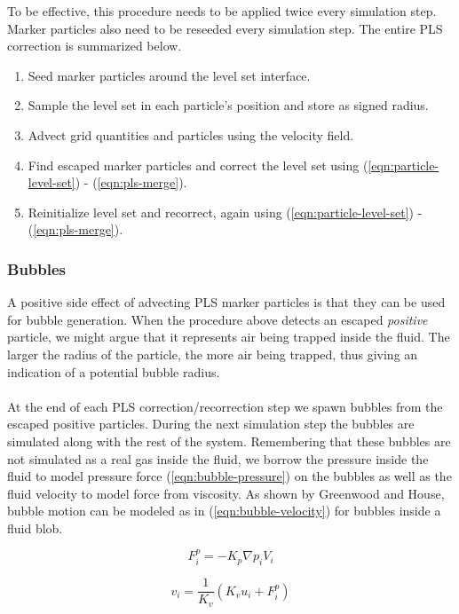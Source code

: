\documentclass[twocolumn]{article}
\begin{document}
To be effective, this procedure needs to be applied twice every simulation step. Marker particles also need to be reseeded every simulation step. The entire PLS correction is summarized below.

\begin{enumerate}
  \item Seed marker particles around the level set interface.
    \item Sample the level set in each particle's position and store as signed radius.
    \item Advect grid quantities and particles using the velocity field.
    \item Find escaped marker particles and correct the level set using (\ref{eqn:particle-level-set}) - (\ref{eqn:pls-merge}).
    \item Reinitialize level set and recorrect, again using (\ref{eqn:particle-level-set}) - (\ref{eqn:pls-merge}).
\end{enumerate}

\subsubsection{Bubbles}
A positive side effect of advecting PLS marker particles is that they can be used for bubble generation. When the procedure above detects an escaped \emph{positive} particle, we might argue that it represents air being trapped inside the fluid. The larger the radius of the particle, the more air being trapped, thus giving an indication of a potential bubble radius.
\\\\
At the end of each PLS correction/recorrection step we spawn bubbles from the escaped positive particles. During the next simulation step the bubbles are simulated along with the rest of the system. Remembering that these bubbles are not simulated as a real gas inside the fluid, we borrow the pressure inside the fluid to model pressure force (\ref{eqn:bubble-pressure}) on the bubbles as well as the fluid velocity to model force from viscosity. As shown by Greenwood and House\cite{betterWithBubbles}, bubble motion can be modeled as in (\ref{eqn:bubble-velocity}) for bubbles inside a fluid blob.

\begin{equation}
  F^p_i = - K_p \nabla p_iV_i
    \label{eqn:bubble-pressure}
\end{equation}

\begin{equation}
  v_i = \frac{1}{K_v}(K_vu_i + F^p_i)
    \label{eqn:bubble-velocity}
\end{equation}
\end{document}
